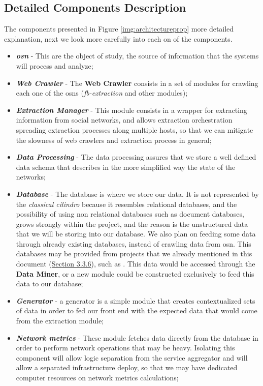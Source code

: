 \subsection{Detailed Components Description}
The components presented in Figure \ref{img:architectureprop} more detailed explanation, next we look more carefully into each on of the components.
\begin{itemize}
    \item \textbf{\textit{\acrfull{osn}}} - This are the object of study, the source of information that the systems will process and analyze;
    \item \textbf{\textit{Web Crawler}} - The \textbf{Web Crawler} consists in a set of modules for crawling each one of the \glspl{osn} (\textit{fb-extraction} and other modules);
    \item \textbf{\textit{Extraction Manager}} - This module consists in a wrapper for extracting information from social networks, and allows extraction orchestration spreading extraction processes along multiple hosts, so that we can mitigate the slowness of web crawlers and extraction process in general;
    \item \textbf{\textit{Data Processing}} - The data processing assures that we store a well defined data schema that describes in the more simplified way the state of the networks;
    \item \textbf{\textit{Database}} - The database is where we store our data. It is not represented by the \textit{classical cilindro} because it resembles relational databases, and the possibility of using non relational databases such as document databases, grows strongly within the project, and the reason is the unstructured data that we will be storing into our database. We also plan on feeding some data through already existing databases, instead of crawling data from \gls{osn}. This databases may be provided from projects that we already mentioned in this document  (\hyperref[sec:otherdatasources]{Section 3.3.6}), such as \citep{kunegis2013konect}. This data would be accessed through the \textbf{Data Miner}, or a new module could be constructed exclusively to feed this data to our database;
    \item \textbf{\textit{Generator}} - a generator is a simple module that creates contextualized sets of data in order to fed our front end with the expected data that would come from the extraction module;
    \item \textbf{\textit{Network metrics}} - These module fetches data directly from the database in order to perform network operations that may be heavy. Isolating this component will allow logic separation from the service aggregator and will allow a separated infrastructure deploy, so that we may have dedicated computer resources on network metrics calculations;

\end{itemize}
